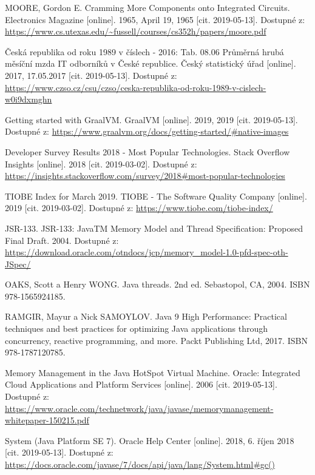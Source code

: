 \begin{literatura}{99}

    MOORE, Gordon E. Cramming More Components onto Integrated Circuits. Electronics Magazine [online]. 1965, April 19, 1965 [cit. 2019-05-13]. Dostupné z: \url{https://www.cs.utexas.edu/~fussell/courses/cs352h/papers/moore.pdf}

    Česká republika od roku 1989 v číslech - 2016: Tab. 08.06 Průměrná hrubá měsíční mzda IT odborníků v České republice. Český statistický úřad [online]. 2017, 17.05.2017 [cit. 2019-05-13]. Dostupné z: \url{https://www.czso.cz/csu/czso/ceska-republika-od-roku-1989-v-cislech-w0i9dxmghn}

    Getting started with GraalVM. GraalVM [online]. 2019, 2019 [cit. 2019-05-13]. Dostupné z: \url{https://www.graalvm.org/docs/getting-started/#native-images}

	Developer Survey Results 2018 - Most Popular Technologies. Stack Overflow Insights [online]. 2018 [cit. 2019-03-02]. Dostupné z: \url{https://insights.stackoverflow.com/survey/2018#most-popular-technologies}

    TIOBE Index for March 2019. TIOBE - The Software Quality Company [online]. 2019 [cit. 2019-03-02]. Dostupné z: \url{https://www.tiobe.com/tiobe-index/}

    JSR-133. JSR-133: JavaTM Memory Model and Thread Specification: Proposed Final Draft. 2004. Dostupné z: \url{https://download.oracle.com/otndocs/jcp/memory_model-1.0-pfd-spec-oth-JSpec/}

    OAKS, Scott a Henry WONG. Java threads. 2nd ed. Sebastopol, CA, 2004. ISBN 978-1565924185.

    RAMGIR, Mayur a Nick SAMOYLOV. Java 9 High Performance: Practical techniques and best practices for optimizing Java applications through concurrency, reactive programming, and more. Packt Publishing Ltd, 2017. ISBN 978-1787120785.

    Memory Management in the Java HotSpot Virtual Machine. Oracle: Integrated Cloud Applications and Platform Services [online]. 2006 [cit. 2019-05-13]. Dostupné z: \url{https://www.oracle.com/technetwork/java/javase/memorymanagement-whitepaper-150215.pdf}

    System (Java Platform SE 7). Oracle Help Center [online]. 2018, 6. říjen 2018 [cit. 2019-05-13]. Dostupné z: \url{https://docs.oracle.com/javase/7/docs/api/java/lang/System.html#gc()}


\end{literatura}
